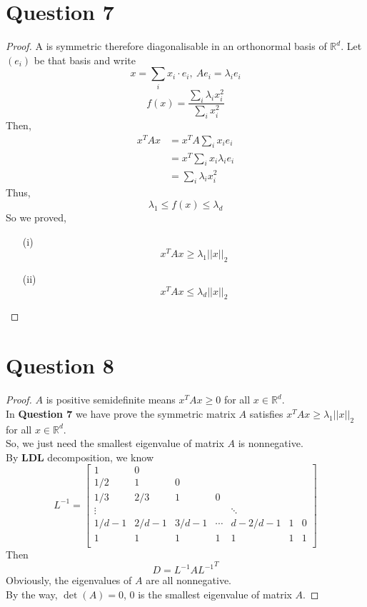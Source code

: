 \documentclass{article}
\begin{document}
\section*{Question 7}
    \begin{proof}
        A is symmetric therefore diagonalisable in an orthonormal basis of $\mathbb{R}^d$. Let $(e_i)$ be that basis and write
        $$x = \sum_i x_i\cdot e_i,\ Ae_i = \lambda_i e_i$$
        $$f(x)=\frac{\sum_i \lambda_i x_i^2}{\sum_i x_i^2}$$
        Then, \begin{align*}
            x^T A x &= x^T A \sum_i x_i e_i\\
            &= x^T \sum_i x_i \lambda_i e_i\\
            &= \sum_i \lambda_i x_i^2
        \end{align*}
        Thus, $$\lambda_1 \leqslant f(x) \leqslant \lambda_d$$
        So we proved, \begin{itemize}
            \item[(i)] $$x^T A x \geqslant \lambda_1 ||x||_2$$
            \item[(ii)] $$x^T A x \leqslant \lambda_d ||x||_2$$
        \end{itemize}
    \end{proof}

\section*{Question 8}
    \begin{proof}
        $A$ is positive semidefinite means $x^T A x \geqslant 0$ for all $x\in\mathbb{R}^d$.\\
        In \textbf{Question 7} we have prove the symmetric matrix $A$ satisfies $x^T A x \geqslant \lambda_1 ||x||_2$ for all $x\in\mathbb{R}^d$.\\
        So, we just need the smallest eigenvalue of matrix $A$ is nonnegative.\\
        By \textbf{LDL} decomposition, we know
        $$L^{-1} = \begin{bmatrix}
            1 & 0\\
            1/2 & 1 & 0\\
            1/3 & 2/3 & 1 & 0\\
            \vdots & & & & \ddots\\
            1/d-1 & 2/d-1 & 3/d-1 & \cdots & d-2/d-1 & 1 & 0\\
            1 & 1 & 1 & 1 & 1 & 1 & 1\\
        \end{bmatrix}$$
        Then $$D = L^{-1} A {L^{-1}}^{T}$$
        Obviously, the eigenvalues of $A$ are all nonnegative.\\
        By the way, $\det(A) = 0$, 0 is the smallest eigenvalue of matrix $A$.
    \end{proof}
\end{document}
